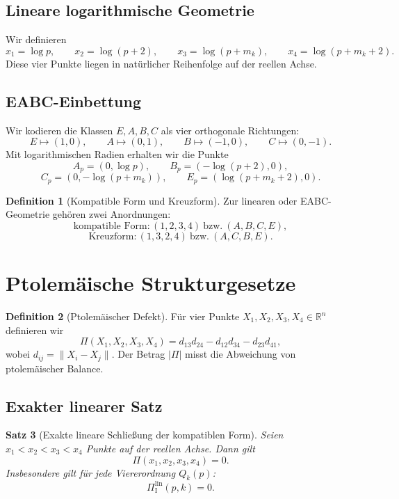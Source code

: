 \documentclass[11pt,a4paper]{article}
\newtheorem{satz}{Satz}
\theoremstyle{definition}
\newtheorem{definition}[satz]{Definition}
\theoremstyle{remark}
\newcommand{\R}{\mathbb{R}}
\begin{document}
\subsection{Lineare logarithmische Geometrie}

Wir definieren
\[
x_1=\log p,\qquad x_2=\log(p+2),\qquad x_3=\log(p+m_k),\qquad x_4=\log(p+m_k+2).
\]
Diese vier Punkte liegen in natürlicher Reihenfolge auf der reellen Achse.

\subsection{EABC-Einbettung}

Wir kodieren die Klassen $E,A,B,C$ als vier orthogonale Richtungen:
\[
E\mapsto (1,0),\qquad A\mapsto (0,1),\qquad B\mapsto (-1,0),\qquad C\mapsto (0,-1).
\]
Mit logarithmischen Radien erhalten wir die Punkte
\[
A_p=(0,\log p),\qquad B_p=(-\log(p+2),0),
\]
\[
C_p=(0,-\log(p+m_k)),\qquad E_p=(\log(p+m_k+2),0).
\]

\begin{definition}[Kompatible Form und Kreuzform]
Zur linearen oder EABC-Geometrie gehören zwei Anordnungen:
\[
\text{kompatible Form}: (1,2,3,4)\ \text{bzw.}\ (A,B,C,E),
\]
\[
\text{Kreuzform}: (1,3,2,4)\ \text{bzw.}\ (A,C,B,E).
\]
\end{definition}

\section{Ptolemäische Strukturgesetze}

\begin{definition}[Ptolemäischer Defekt]
Für vier Punkte $X_1,X_2,X_3,X_4\in \R^n$ definieren wir
\[
\Pi(X_1,X_2,X_3,X_4)
=
d_{13}d_{24}-d_{12}d_{34}-d_{23}d_{41},
\]
wobei $d_{ij}=\|X_i-X_j\|$.
\]
Der Betrag $|\Pi|$ misst die Abweichung von ptolemäischer Balance.
\end{definition}

\subsection{Exakter linearer Satz}

\begin{satz}[Exakte lineare Schließung der kompatiblen Form]
Seien $x_1<x_2<x_3<x_4$ Punkte auf der reellen Achse. Dann gilt
\[
\Pi(x_1,x_2,x_3,x_4)=0.
\]
Insbesondere gilt für jede Viererordnung $Q_k(p)$:
\[
\Pi_{\mathrm I}^{\mathrm{lin}}(p,k)=0.
\]
\end{satz}
\end{document}
